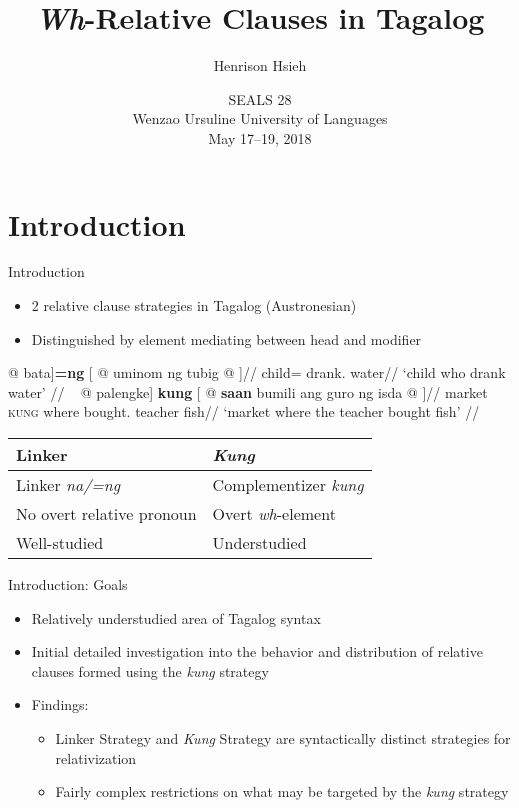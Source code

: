 \documentclass[pdf]{beamer}
\author{Henrison Hsieh}
\institute{McGill University}
\title{\textit{Wh}-Relative Clauses in Tagalog}
\date[SEALS 28]{SEALS 28\\%
  Wenzao Ursuline University of Languages\\%
  May 17--19, 2018}
\newcommand{\texthl}[1]{\textcolor{cyan!75!blue}{\textbf{#1}}}
\begin{document}
\frame{\titlepage}

\section{Introduction}

\begin{frame}{Introduction}
  \begin{itemize}
    \item 2 relative clause strategies in Tagalog (Austronesian)
    \item Distinguished by element mediating between head and modifier
  \end{itemize}

  \pause

  \ex\begingl
      \gla  {[} @ bata]\texthl{=ng} [ @ uminom ng tubig @ ]//
      \glb  child=\Lk{} drank.\Av{} \Gen{} water//
      \glft `child who drank water'
            //
    \endgl
  \xe
  \ex~\begingl
      \gla  {[} @ palengke] \texthl{kung} [ @ \texthl{saan} bumili ang guro ng isda @ ]//
      \glb  market \textsc{kung} where bought.\Av{} \Nom{} teacher \Gen{} fish//
      \glft `market where the teacher bought fish'
            //
    \endgl
  \xe

  \pause

  \begin{table}
    \begin{tabular}{ll}\toprule
      \textbf{Linker} & \textit{\textbf{Kung}} \\\midrule
      Linker \textit{na/=ng} & Complementizer \textit{kung} \\
      No overt relative pronoun & Overt \textit{wh}-element \\
      Well-studied & Understudied \\\bottomrule
    \end{tabular}
  \end{table}
\end{frame}

\begin{frame}{Introduction: Goals}
  \begin{itemize}
    \item Relatively understudied area of Tagalog syntax
    \item Initial detailed investigation into the behavior and distribution of relative clauses formed using the \textit{kung} strategy
    \item Findings:
    \begin{itemize}
      \item Linker Strategy and \textit{Kung} Strategy are syntactically distinct strategies for relativization \citep[contra][]{otsuka2016}
      \item Fairly complex restrictions on what may be targeted by the \textit{kung} strategy
    \end{itemize}
  \end{itemize}
\end{frame}
\end{document}
